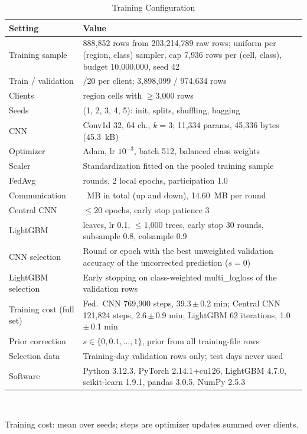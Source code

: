 \begin{table}[t]
\centering
\footnotesize
\caption{Training Configuration}
\label{tab:config}
\setlength{\tabcolsep}{3pt}
\begin{tabularx}{\columnwidth}{@{}l>{\raggedright\arraybackslash}X@{}}
\toprule
Setting & Value \\
\midrule
Training sample & 4{,}888{,}852 rows from 203{,}214{,}789 raw rows; uniform per (region, class) sampler, cap 7{,}936 rows per (cell, class), budget 10{,}000{,}000, seed 42 \\
Train / validation & 80/20 per client; 3{,}898{,}099 / 974{,}634 rows \\
Clients & 161 region cells with $\geq$3{,}000 rows \\
Seeds & 5 (1, 2, 3, 4, 5): init, splits, shuffling, bagging \\
CNN & Conv1d 32, 64 ch., $k=3$; 11{,}334 params, 45{,}336 bytes (45.3~kB) \\
Optimizer & Adam, lr $10^{-3}$, batch 512, balanced class weights \\
Scaler & Standardization fitted on the pooled training sample \\
FedAvg & 50 rounds, 2 local epochs, participation 1.0 \\
Communication & 729.9~MB in total (up and down), 14.60~MB per round \\
Central CNN & $\leq$20 epochs, early stop patience 3 \\
LightGBM & 127 leaves, lr 0.1, $\leq$1{,}000 trees, early stop 30 rounds, subsample 0.8, colsample 0.9 \\
CNN selection & Round or epoch with the best unweighted validation accuracy of the uncorrected prediction ($s=0$) \\
LightGBM selection & Early stopping on class-weighted multi\_logloss of the validation rows \\
Training cost (full set) & Fed.\ CNN 769{,}900 steps, 39.3{\,}$\pm${\,}0.2 min; Central CNN 121{,}824 steps, 2.6{\,}$\pm${\,}0.9 min; LightGBM 62 iterations, 1.0{\,}$\pm${\,}0.1 min \\
Prior correction & $s\in\{0,0.1,\ldots,1\}$, prior from all training-file rows \\
Selection data & Training-day validation rows only; test days never used \\
Software & Python 3.12.3, PyTorch 2.14.1+cu126, LightGBM 4.7.0, scikit-learn 1.9.1, pandas 3.0.5, NumPy 2.5.3 \\
\bottomrule
\end{tabularx}
\\[2pt]
\parbox{\linewidth}{\scriptsize Training cost: mean over seeds; steps are optimizer updates summed over clients.}
\end{table}

